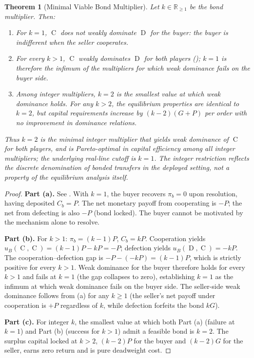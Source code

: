 \documentclass[11pt,a4paper]{article}
\newtheorem{theorem}{Theorem}[section]
\theoremstyle{definition}
\theoremstyle{remark}
\newcommand{\pay}{P}           %
\newcommand{\cumval}{G}        %
\newcommand{\bbond}{C_b}       %
\newcommand{\bpay}{\pi_b}      %
\newcommand{\ub}{u_B}          %
\DeclareMathOperator{\Coop}{C}
\DeclareMathOperator{\Def}{D}
\begin{document}
\begin{theorem}[Minimal Viable Bond Multiplier]
\label{thm:2x-sufficient}
Let $k \in \mathbb{R}_{\geq 1}$ be the bond multiplier. Then:
\begin{enumerate}[label=(\alph*)]
  \item For $k = 1$, $\Coop$ does not weakly dominate $\Def$ for the
    buyer: the buyer is indifferent when the seller cooperates.
  \item For every $k > 1$, $\Coop$ weakly dominates $\Def$ for both
    players (); $k = 1$ is therefore the
    infimum of the multipliers for which weak dominance fails on the
    buyer side.
  \item Among integer multipliers, $k = 2$ is the smallest value at
    which weak dominance holds. For any $k > 2$, the equilibrium
    properties are identical to $k = 2$, but capital requirements
    increase by $(k - 2)(\cumval + \pay)$ per order with no
    improvement in dominance relations.
\end{enumerate}
Thus $k = 2$ is the minimal \emph{integer} multiplier that yields
weak dominance of $\Coop$ for both players, and is Pareto-optimal in
capital efficiency among all integer multipliers; the underlying
real-line cutoff is $k = 1$. The integer restriction reflects the
discrete denomination of bonded transfers in the deployed setting,
not a property of the equilibrium analysis itself.
\end{theorem}

\begin{proof}
\textbf{Part (a).} See . With $k = 1$, the buyer
recovers $\bpay = 0$ upon resolution, having deposited $\bbond = \pay$.
The net monetary payoff from cooperating is $-\pay$; the net from
defecting is also $-\pay$ (bond locked). The buyer cannot be motivated
by the mechanism alone to resolve.

\textbf{Part (b).} For $k > 1$: $\bpay = (k-1)\pay$, $\bbond = k\pay$.
Cooperation yields $\ub(\Coop, \Coop) = (k-1)\pay - k\pay = -\pay$;
defection yields $\ub(\Def, \Coop) = -k\pay$. The cooperation--defection
gap is $-\pay - (-k\pay) = (k-1)\pay$, which is strictly positive for
every $k > 1$. Weak dominance for the buyer therefore holds for every
$k > 1$ and fails at $k = 1$ (the gap collapses to zero), establishing
$k = 1$ as the infimum at which weak dominance fails on the buyer
side. The seller-side weak dominance follows from
(a) for any $k \geq 1$ (the seller's net
payoff under cooperation is $+\pay$ regardless of $k$, while
defection forfeits the bond $k\cumval$).

\textbf{Part (c).} For integer $k$, the smallest value at which
both Part (a) (failure at $k=1$) and Part (b) (success for $k > 1$)
admit a feasible bond is $k = 2$. The surplus capital locked at
$k > 2$, $(k - 2)\pay$ for the buyer and $(k - 2)\cumval$ for the
seller, earns zero return and is pure deadweight cost.
\end{proof}
\end{document}
